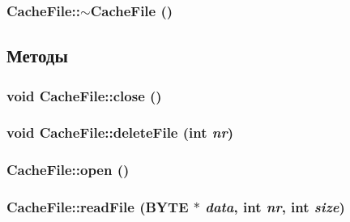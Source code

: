 \hypertarget{class_cache_file_19596f187818008dad37012d2e7b9dd8}{
\subsubsection[{$\sim$CacheFile}]{\setlength{\rightskip}{0pt plus 5cm}CacheFile::$\sim$CacheFile ()}}
\label{class_cache_file_19596f187818008dad37012d2e7b9dd8}




\subsection{Методы}
\hypertarget{class_cache_file_3ca771e4b8f81fb85a51067461630e77}{
\subsubsection[{close}]{\setlength{\rightskip}{0pt plus 5cm}void CacheFile::close ()}}
\label{class_cache_file_3ca771e4b8f81fb85a51067461630e77}


\hypertarget{class_cache_file_8691ef7017c4e585b07201fae31b694e}{
\subsubsection[{deleteFile}]{\setlength{\rightskip}{0pt plus 5cm}void CacheFile::deleteFile (int {\em nr})}}
\label{class_cache_file_8691ef7017c4e585b07201fae31b694e}


\hypertarget{class_cache_file_19854d9816d80a55a55176e90de9d6e6}{
\subsubsection[{open}]{ CacheFile::open ()}}
\label{class_cache_file_19854d9816d80a55a55176e90de9d6e6}


\hypertarget{class_cache_file_eb99cac63e110c6d21a5866200763fa9}{
\subsubsection[{readFile}]{ CacheFile::readFile ({\bf BYTE} $\ast$ {\em data}, \/  int {\em nr}, \/  int {\em size})}}
\label{class_cache_file_eb99cac63e110c6d21a5866200763fa9}


